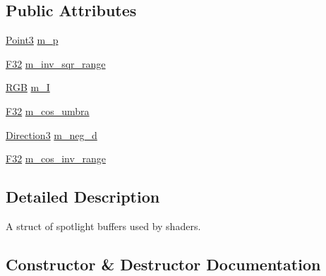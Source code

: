 \subsection*{Public Attributes}
\begin{DoxyCompactItemize}
\item 
\mbox{\hyperlink{structmage_1_1_point3}{Point3}} \mbox{\hyperlink{structmage_1_1rendering_1_1_spot_light_buffer_aea38ba213d99bbdf0c36ce27bc0c64c5}{m\+\_\+p}}
\item 
\mbox{\hyperlink{namespacemage_aa97e833b45f06d60a0a9c4fc22ae02c0}{F32}} \mbox{\hyperlink{structmage_1_1rendering_1_1_spot_light_buffer_a279a981f476ecbc4efd875626071d046}{m\+\_\+inv\+\_\+sqr\+\_\+range}}
\item 
\mbox{\hyperlink{structmage_1_1_r_g_b}{R\+GB}} \mbox{\hyperlink{structmage_1_1rendering_1_1_spot_light_buffer_ab67a7ecde450e0096563c4be789156c9}{m\+\_\+I}}
\item 
\mbox{\hyperlink{namespacemage_aa97e833b45f06d60a0a9c4fc22ae02c0}{F32}} \mbox{\hyperlink{structmage_1_1rendering_1_1_spot_light_buffer_afa3c23903a4b31bf6b7da537d7f9b660}{m\+\_\+cos\+\_\+umbra}}
\item 
\mbox{\hyperlink{structmage_1_1_direction3}{Direction3}} \mbox{\hyperlink{structmage_1_1rendering_1_1_spot_light_buffer_a0a52ef76133f10b93030f86ce628b334}{m\+\_\+neg\+\_\+d}}
\item 
\mbox{\hyperlink{namespacemage_aa97e833b45f06d60a0a9c4fc22ae02c0}{F32}} \mbox{\hyperlink{structmage_1_1rendering_1_1_spot_light_buffer_a80c169b3f3e87c7d91a7b2b4473e4136}{m\+\_\+cos\+\_\+inv\+\_\+range}}
\end{DoxyCompactItemize}


\subsection{Detailed Description}
A struct of spotlight buffers used by shaders. 

\subsection{Constructor \& Destructor Documentation}
\mbox{\label{structmage_1_1rendering_1_1_spot_light_buffer_a603e2c40ae924a2183f24604297715aa}} 

